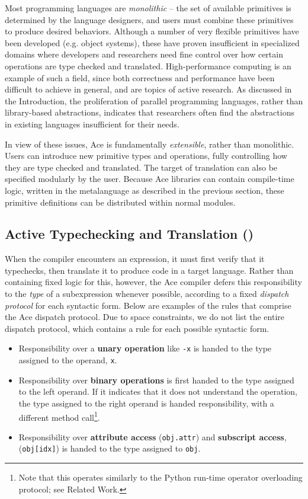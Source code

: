 \documentclass[10pt, conference, compsocconf]{IEEEtran}
\begin{document}
Most programming languages are {\em monolithic} -- the set of available primitives is determined by the language designers, and users must combine these primitives to produce desired behaviors. Although a number of very flexible primitives have been developed (e.g. object systems), these have proven insufficient in specialized domains where developers and researchers need fine control over how certain operations are type checked and translated. High-performance computing is an example of such a field, since both correctness and performance have been difficult to achieve in general, and are topics of active research. As discussed in the Introduction, the proliferation of parallel programming languages, rather than library-based abstractions, indicates that researchers often find the abstractions in existing languages insufficient for their needs.

In view of these issues, Ace is fundamentally {\em extensible}, rather than monolithic. Users can introduce new primitive types and operations, fully controlling how they are type checked and translated. The target of translation can also be specified modularly by the user. Because Ace libraries can contain compile-time logic, written in the metalanguage as described in the previous section, these primitive definitions can be distributed within normal modules.

\subsection{Active Typechecking and Translation (\ATT)}

When the compiler encounters an expression, it must first verify that it typechecks, then translate it to produce code in a target language. Rather than containing fixed logic for this, however, the Ace compiler defers this responsibility to the {\it type} of a subexpression whenever possible, according to a fixed {\em dispatch protocol} for each syntactic form. Below are examples of the rules that comprise the Ace dispatch protocol. Due to space constraints, we do not list the entire dispatch protocol, which contains a rule for each possible syntactic form.
\begin{itemize}
\item Responsibility over a {\bf unary operation} like \verb|-x| is handed to the type assigned to the operand, \verb|x|.
\item Responsibility over {\bf binary operations} is first handed to the type assigned to the left operand. If it indicates that it does not understand the operation, the type assigned to the right operand is handed responsibility, with a different method call\footnote{Note that this operates similarly to the Python run-time operator overloading protocol; see Related Work.}.
\item Responsibility over {\bf attribute access} (\texttt{obj.attr}) and {\bf subscript access}, (\texttt{obj[idx]}) is handed to the type assigned to \texttt{obj}.
\end{itemize}
\end{document}
